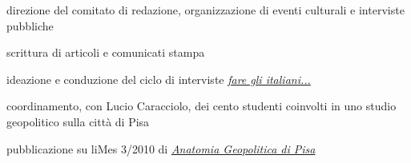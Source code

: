\documentclass[a4paper]{deedy-resume} %
\begin{document}
\begin{minipage}[t]{0.66\textwidth}
\sectionspace %



\begin{tightitemize}
\item direzione del comitato di redazione, organizzazione di eventi culturali e interviste pubbliche
\item scrittura di articoli e comunicati stampa
\end{tightitemize}

\sectionspace %



\begin{tightitemize}
\item ideazione e conduzione del ciclo di interviste \href{http://www.faretv.net/home/trasmissioni/4-incontri-per-fare-gli-italiani}{\textit{fare gli italiani...}}
\end{tightitemize}

\sectionspace %



\begin{tightitemize}
\item coordinamento, con Lucio Caracciolo, dei cento studenti coinvolti in uno studio geopolitico sulla città di Pisa
\item pubblicazione su liMes 3/2010 di \href{http://temi.repubblica.it/limes/la-russia-sovrana/15767}{\textit{Anatomia Geopolitica di Pisa}}
\end{tightitemize}

\sectionspace %




\end{minipage}
\end{document}
